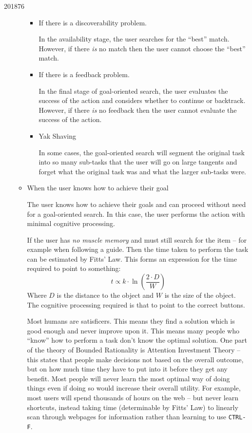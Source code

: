 \documentclass[10pt,\jkfside,a4paper]{article}
\begin{document}
\begin{examquestion}{2018}{7}{6}
\begin{enumerate}
\begin{itemize}
\begin{itemize}
\item If there is a discoverability problem.

In the availability stage, the user searches for the ``best'' match. However,
if there \textit{is} no match then the user cannot choose the ``best'' match.

\item If there is a feedback problem.

In the final stage of goal-oriented search, the user evaluates the success
of the action and considers whether to continue or backtrack. However, if
there \textit{is} no feedback then the user cannot evaluate the success of
the action.

\item Yak Shaving

In some cases, the goal-oriented search will segment the original task into
so many sub-tasks that the user will go on large tangents and forget what the
original task was and what the larger sub-tasks were.

\end{itemize}

\item When the user knows how to achieve their goal

The user knows how to achieve their goals and can proceed without need for a
goal-oriented search. In this case, the user performs the action with
minimal cognitive processing.

If the user has \textit{no muscle memory} and must still search for the
item -- for example when following a guide. Then the time taken to perform
the task can be estimated by Fitts' Law. This forms an expression for the
time required to point to something:
\[
t \propto k \cdot \ln \left( \frac{2 \cdot D}{W} \right)
\]
Where $D$ is the distance to the object and $W$ is the size of the object.
The cognitive processing required is that to point to the correct buttons.

Most humans are satisficers. This means they find a solution which is good
enough and never improve upon it. This means many people who ``know'' how to
perform a task don't know the optimal solution. One part of the theory of
Bounded Rationality is Attention Investment Theory -- this states that
people make decisions not based on the overall outcome, but on how much
time they have to put into it before they get any benefit. Most people will
never learn the most optimal way of doing things even if doing so would
increase their overall utility. For example, most users will spend thousands
of hours on the web -- but never learn shortcuts, instead taking time
(determinable by Fitts' Law) to linearly scan through webpages for
information rather than learning to use \texttt{CTRL-F}.


\end{itemize}
\end{enumerate}
\end{examquestion}
\end{document}
